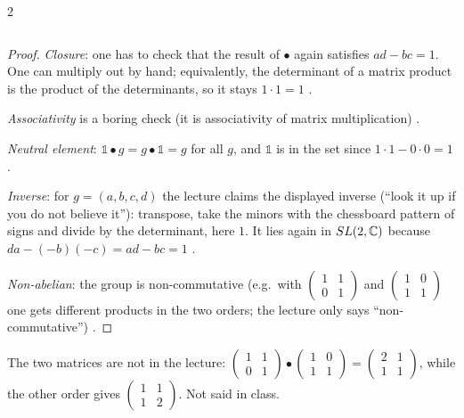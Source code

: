 \begin{paracol}{2}
\begin{proposition}[$SL(2,\C)$ is a group]
\[\]
\end{proposition}
\begin{proof}
\emph{Closure}: one has to check that the result of $\bullet$ again satisfies $ad-bc=1$. One can multiply out by hand; equivalently, the determinant of a matrix product is the product of the determinants, so it stays $1\cdot1=1$  .\par
\emph{Associativity} is a boring check (it is associativity of matrix multiplication) .\par
\emph{Neutral element}: $\mathbb 1\bullet g=g\bullet\mathbb 1=g$ for all $g$, and $\mathbb 1$ is in the set since $1\cdot1-0\cdot0=1$ .\par
\emph{Inverse}: for $g=(a,b,c,d)$ the lecture claims the displayed inverse (``look it up if you do not believe it''): transpose, take the minors with the chessboard pattern of signs and divide by the determinant, here $1$. It lies again in $SL(2,\C)$ because $da-(-b)(-c)=ad-bc=1$     .\par
\emph{Non-abelian}: the group is non-commutative (e.g.\ with $\begin{pmatrix}1&1\\0&1\end{pmatrix}$ and $\begin{pmatrix}1&0\\1&1\end{pmatrix}$ one gets different products in the two orders; the lecture only says ``non-commutative'') .
\end{proof}
\begin{coursenote}
The two matrices are not in the lecture: $\begin{pmatrix}1&1\\0&1\end{pmatrix}\bullet\begin{pmatrix}1&0\\1&1\end{pmatrix}=\begin{pmatrix}2&1\\1&1\end{pmatrix}$, while the other order gives $\begin{pmatrix}1&1\\1&2\end{pmatrix}$. Not said in class. 
\end{coursenote}


\end{paracol}
